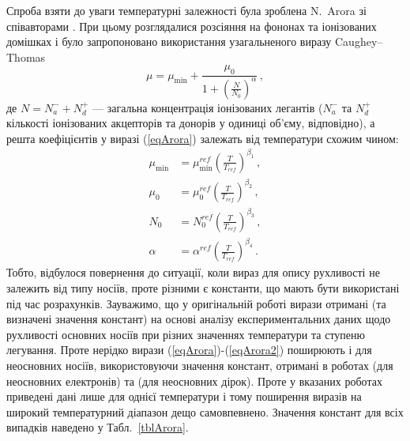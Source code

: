 \documentclass[10pt,a5paper,titlepage,oneside]{book}
\numberwithin{equation}{part}
\begin{document}
Спроба взяти до уваги температурні залежності була зроблена N.~Arora зі співавторами \cite{Arora1982}.
При цьому розглядалися розсіяння на фононах та  іонізованих домішках і було запропоновано використання узагальненого виразу Caughey--Thomas
\begin{equation}\label{eqArora}
  \mu=\mu_\mathrm{min}+\frac{\mu_0}{1+\left(\frac{N}{N_0}\right)^\alpha}\,,
\end{equation}
де $N=N_a^-+N_d^+$ --- загальна концентрація іонізованих легантів
($N_a^-$ та $N_d^+$ кількості іонізованих акцепторів та донорів у одиниці об'єму, відповідно),
а решта коефіцієнтів у виразі (\ref{eqArora}) залежать від температури схожим чином:
\begin{equation}\label{eqArora2}
\begin{aligned}
    \mu_\mathrm{min} &=\mu_\mathrm{min}^{ref}\left(\frac{T}{T_{ref}}\right)^{\beta_1}\,, \\
   \mu_0 &=\mu_0^{ref}\left(\frac{T}{T_{ref}}\right)^{\beta_2}\,,\\
   N_0 &=N_0^{ref}\left(\frac{T}{T_{ref}}\right)^{\beta_3}\,,\\
   \alpha &=\alpha^{ref}\left(\frac{T}{T_{ref}}\right)^{\beta_4}\,.\
\end{aligned}
\end{equation}
Тобто, відбулося повернення до ситуації, коли вираз для опису рухливості не залежить від типу носіїв, проте
різними є константи, що мають бути використані під час розрахунків.
Зауважимо, що у оригінальній роботі \cite{Arora1982} вирази отримані (та визначені значення констант)
на основі аналізу експериментальних даних щодо рухливості основних носіїв при різних значеннях температури та ступеню легування.
Проте нерідко вирази (\ref{eqArora})-(\ref{eqArora2}) поширюють і для неосновних носіїв, використовуючи значення констант,
отримані в роботах \cite{Swirhun1986} (для неосновних електронів) та \cite{Alamo1985} (для неосновних дірок).
Проте у вказаних роботах приведені дані лише для однієї температури і тому поширення виразів на широкий температурний діапазон дещо самовпевнено.
Значення констант для всіх випадків наведено у Табл.~\ref{tblArora}.
\end{document}
